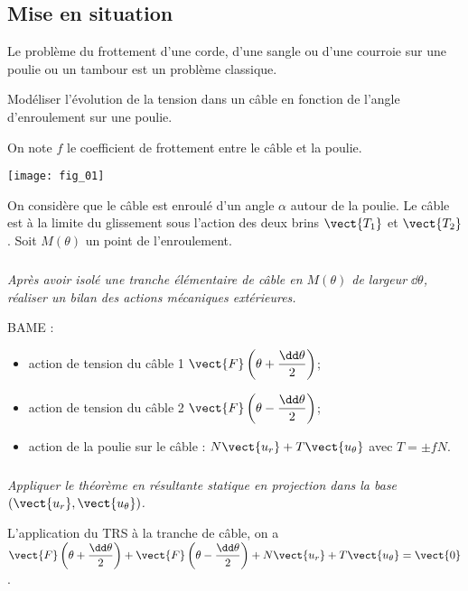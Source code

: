 \ifprof
\begin{multicols}{2}
\else
\begin{multicols}{2}
\fi
\section*{Mise en situation}
\ifprof
\else
\fi

Le problème du frottement d'une corde, d'une sangle ou d'une courroie sur une poulie ou
un tambour est un problème classique. 
\begin{obj}
Modéliser l'évolution de la tension dans un câble en fonction de l'angle d'enroulement sur une poulie. 
\end{obj}

On note $f$ le coefficient de frottement entre le câble et la poulie. 
\begin{center}
\texttt{[image: fig\_01]}
\end{center}

On considère que le câble est enroulé d'un angle $\alpha$ autour de la poulie. Le câble est à la limite du glissement sous l'action des deux brins $\vect{T_1}$ et $\vect{T_2}$. Soit $M(\theta)$ un point de l'enroulement. 

\subparagraph{}\textit{Après avoir isolé une tranche élémentaire de câble en $M(\theta)$ de largeur $\dd \theta$, réaliser un bilan des actions mécaniques extérieures. }
\ifprof
\begin{corrige}
BAME :
\begin{itemize}
\item action de tension du câble 1 $\vect{F}\left(\theta+\dfrac{\dd \theta}{2}\right)$;
\item action de tension du câble 2 $\vect{F}\left(\theta-\dfrac{\dd \theta}{2}\right)$;
\item action de la poulie sur le câble : $N\vect{u_r}+T\vect{u_{\theta}}$ avec $T=\pm fN$.
\end{itemize}

\end{corrige}
\else
\fi


\subparagraph{}\textit{Appliquer le théorème en résultante statique en projection dans la base $\left( \vect{u_r}, \vect{u_{\theta}}\right)$.}
\ifprof
\begin{corrige}
L'application du TRS à la tranche de câble, on a $\vect{F}\left(\theta+\dfrac{\dd \theta}{2}\right) + \vect{F}\left(\theta-\dfrac{\dd \theta}{2}\right) + N\vect{u_r}+T\vect{u_{\theta}} = \vect{0}$.


\end{corrige}
\end{multicols}
\end{multicols}
